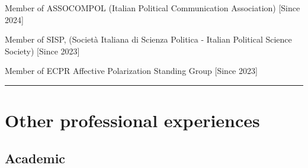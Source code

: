 \documentclass[10pt,]{article}
\renewenvironment{itemize}{
  \begin{list}{}{
    \setlength{\leftmargin}{1.5em}
  }
}{
  \end{list}
}
\begin{document}
\begin{itemize}
\item
  Member of ASSOCOMPOL (Italian Political Communication Association)
  {[}Since 2024{]}
\item
  Member of SISP, (Società Italiana di Scienza Politica - Italian
  Political Science Society) {[}Since 2023{]}
\item
  Member of ECPR Affective Polarization Standing Group {[}Since 2023{]}

  \bigskip \hrule
\end{itemize}

\section{Other professional
experiences}\label{other-professional-experiences}

\subsection{Academic}\label{academic}
\end{document}
